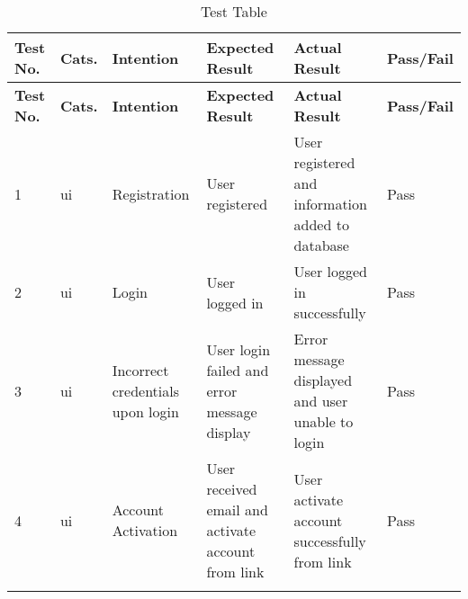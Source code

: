 \newpage
\begin{landscape}
\section{}
\label{app:appendix-c}
\begin{longtable}{ |m{1cm}|m{1cm}|m{5cm}|m{5cm}|m{5cm}|m{2cm}| }
    \hline
    \rowcolor{lightgray}
    \textbf{Test No.} & \textbf{Cats.} & \textbf{Intention} & \textbf{Expected Result} & \textbf{Actual Result} & \textbf{Pass/Fail} \\
    \hline
    \endfirsthead

    \hline
    \rowcolor{lightgray}
    \textbf{Test No.} & \textbf{Cats.} & \textbf{Intention} & \textbf{Expected Result} & \textbf{Actual Result} & \textbf{Pass/Fail} \\
    \hline
    \endhead
    1 & \gls{ui} & Registration & User registered & User registered and information added to database & Pass \\
    \hline
    2 & \gls{ui} & Login & User logged in & User logged in successfully & Pass \\
    \hline
    3 & \gls{ui} & Incorrect credentials upon login & User login failed and error message display & Error message displayed and user unable to login & Pass \\
    \hline
    4 & \gls{ui} & Account Activation & User received email and activate account from link & User activate account successfully from link & Pass \\
    \hline
    \caption{Test Table}
\end{longtable}
\end{landscape}
